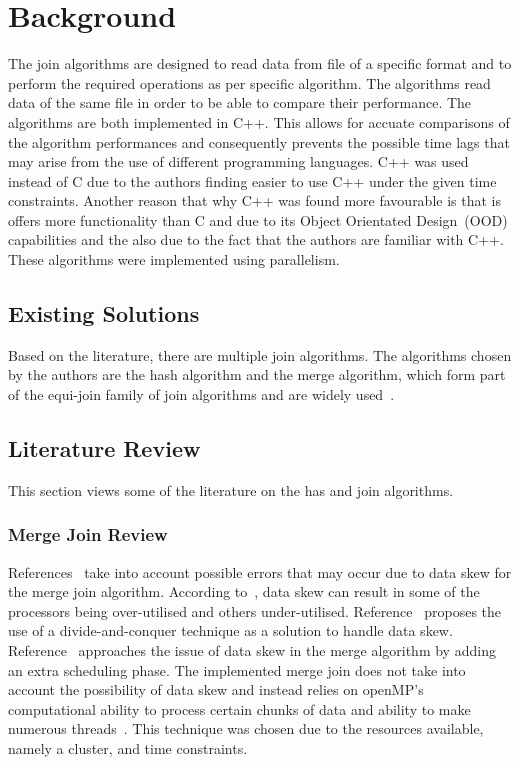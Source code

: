 \documentclass[conference, 11pt]{IEEEtran}
\begin{document}
\section{Background}
	The join algorithms are designed to read data from  file of a specific format and to perform the required operations as per specific algorithm. The algorithms read data of the same file in order to be able to compare their performance. The algorithms are both implemented in C++. This allows for accuate comparisons of the algorithm performances and consequently prevents the possible time lags that may arise from the use of different programming languages. C++ was used instead of C due to the authors finding easier to use C++ under the given time constraints. Another reason that why C++ was found more favourable is that is offers more functionality than C and due to its Object Orientated Design~(OOD) capabilities and the also due to the fact that the authors are familiar with C++. These algorithms were implemented using parallelism.
	
	\subsection{Existing Solutions}
	Based on the literature, there are multiple join algorithms. The algorithms chosen by the authors are the hash algorithm and the merge algorithm, which form part of the equi-join family of join algorithms and are widely used~\cite{daniel}.
	
	\subsection{Literature Review}
	This section views some of the literature on the has and join algorithms.
	
	\subsubsection{Merge Join Review}
	References~\cite{daniel,wolf} take into account possible errors that may occur due to data skew for the merge join algorithm. According to~\cite{daniel}, data skew can result in some of the processors being over-utilised and others under-utilised. Reference~\cite{daniel} proposes the use of a divide-and-conquer technique as a solution to handle data skew. Reference~\cite{wolf} approaches the issue of data skew in the merge algorithm by adding an extra scheduling phase. The implemented merge join does not take into account the possibility of data skew and instead relies on openMP's computational ability to process certain chunks of data and ability to make numerous threads~\cite{omp}. This technique was chosen due to the resources available, namely a cluster, and time constraints.
	
\end{document}
